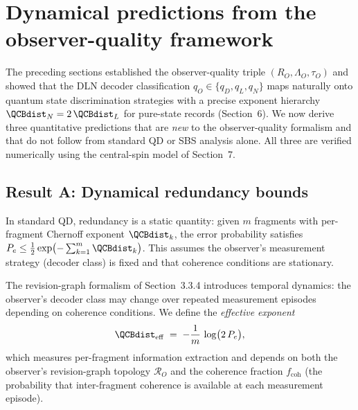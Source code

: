 %
%

\section{Dynamical predictions from the observer-quality framework}
\label{sec:dynamical}

The preceding sections established the observer-quality triple
$(R_O, \Lambda_O, \tau_O)$ and showed that the DLN decoder classification
$q_O \in \{q_D, q_L, q_N\}$ maps naturally onto quantum state discrimination
strategies with a precise exponent hierarchy $\QCBdist_N = 2\,\QCBdist_L$ for
pure-state records (Section~6).  We now derive three quantitative
predictions that are \emph{new} to the observer-quality formalism and that
do not follow from standard QD or SBS analysis alone.  All three are
verified numerically using the central-spin model of Section~7.


\subsection{Result A: Dynamical redundancy bounds}
\label{sec:result_a}

In standard QD, redundancy is a static quantity: given $m$ fragments with
per-fragment Chernoff exponent $\QCBdist_k$, the error probability satisfies
$P_e \le \tfrac{1}{2}\exp\bigl(-\sum_{k=1}^m \QCBdist_k\bigr)$.  This
assumes the observer's measurement strategy (decoder class) is fixed and
that coherence conditions are stationary.

The revision-graph formalism of Section~3.3.4 introduces temporal dynamics:
the observer's decoder class may change over repeated measurement episodes
depending on coherence conditions.  We define the \emph{effective exponent}
\begin{equation}
\label{eq:xi_eff}
  \QCBdist_{\mathrm{eff}}
  \;=\;
  -\frac{1}{m}\,\log\bigl(2\,P_e\bigr),
\end{equation}
which measures per-fragment information extraction and depends on both the
observer's revision-graph topology $\mathcal{R}_O$ and the coherence fraction
$f_{\mathrm{coh}}$ (the probability that inter-fragment coherence is available
at each measurement episode).

